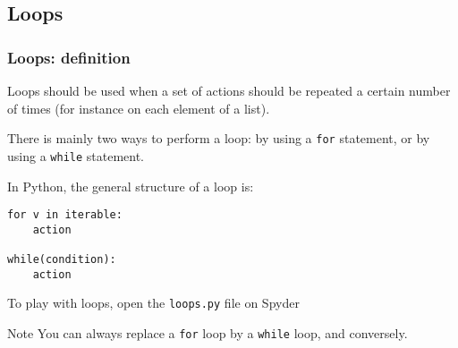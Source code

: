 \subsection{Loops}
\begin{frame}[fragile]
    \frametitle{Loops: definition}
    Loops should be used when a set of actions should be repeated a certain number of times (for instance on each element of a list).\\
    \vspace{1em}

    There is mainly two ways to perform a loop: by using a \verb+for+ statement, or by using a \verb+while+ statement.

    \vspace{1em}
    In Python, the general structure of a loop is:
    \begin{lstlisting}[basicstyle=\ttfamily\scriptsize]
for v in iterable:
    action

while(condition):
    action
    \end{lstlisting}

    \vspace{1em}
    To play with loops, open the \verb+loops.py+ file on Spyder

    \begin{block}{Note}
        You can always replace a \verb+for+ loop by a \verb+while+ loop, and conversely. 
    \end{block}
\end{frame}

